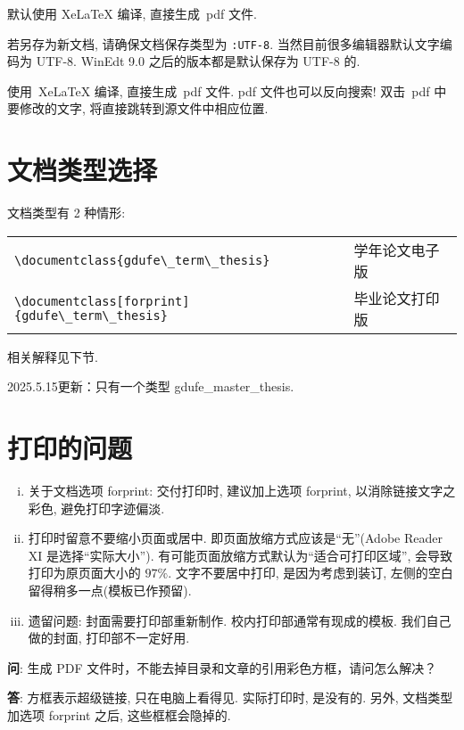 \documentclass[class=academic]{gdufe_master_thesis}
\begin{document}
默认使用 XeLaTeX 编译, 直接生成~pdf 文件.

若另存为新文档, 请确保文档保存类型为 \verb|:UTF-8|. 当然目前很多编辑器默认文字编码为 UTF-8.
WinEdt 9.0 之后的版本都是默认保存为 UTF-8 的.

使用~XeLaTeX 编译, 直接生成~pdf 文件.
pdf 文件也可以反向搜索! 双击~pdf 中要修改的文字, 将直接跳转到源文件中相应位置.

\section{文档类型选择}
文档类型有 2 种情形:

\begin{table}[ht]\centering
    \begin{tabular}{ll}
        \hline
        \verb|\documentclass{gdufe\_term\_thesis}|           & 学年论文电子版 \\
        \verb|\documentclass[forprint]{gdufe\_term\_thesis}| & 毕业论文打印版 \\
        \hline
    \end{tabular}
\end{table}
相关解释见下节.

2025.5.15更新：只有一个类型 gdufe\_master\_thesis.

\section{打印的问题}
\begin{enumerate}[i)]
    \item  关于文档选项 forprint: 交付打印时, 建议加上选项 forprint, 以消除链接文字之彩色, 避免打印字迹偏淡.
    \item  打印时留意不要缩小页面或居中. 即页面放缩方式应该是``无''(Adobe Reader XI 是选择``实际大小'').
          有可能页面放缩方式默认为``适合可打印区域'', 会导致打印为原页面大小的 $97\%$.
          文字不要居中打印, 是因为考虑到装订, 左侧的空白留得稍多一点(模板已作预留).
    \item  遗留问题: 封面需要打印部重新制作.  校内打印部通常有现成的模板.
          我们自己做的封面, 打印部不一定好用.
\end{enumerate}

\textbf{问}: {\kaishu 生成 PDF 文件时，不能去掉目录和文章的引用彩色方框，请问怎么解决？}

\textbf{答}: {\kaishu 方框表示超级链接, 只在电脑上看得见. 实际打印时, 是没有的. 另外, 文档类型加选项 forprint 之后, 这些框框会隐掉的. }
\end{document}
